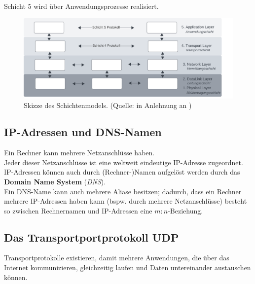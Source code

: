 \begin{tcolorbox}[enlarge top by=0.5cm,enlarge bottom by=0.5cm]
    Schicht 5 wird über Anwendungsprozesse realisiert.
\end{tcolorbox}


\begin{figure}
    \centering
    \includegraphics[width=16cm]{chapters/fopt5/img/layers}
    \caption{Skizze des Schichtenmodels. (Quelle: in Anlehnung an \cite[257, Bild 5.2]{Oec22})}
    \label{fig:layers}
\end{figure}


\subsection{IP-Adressen und DNS-Namen}

Ein Rechner kann mehrere Netzanschlüsse haben.\\

\noindent
Jeder dieser Netzanschlüsse ist eine weltweit eindeutige IP-Adresse zugeordnet.\\

\noindent
IP-Adressen können auch durch (Rechner-)Namen aufgelöst werden durch das \textbf{Domain Name System} (\textit{DNS}).\\

\noindent
Ein DNS-Name kann auch mehrere Aliase besitzen; dadurch, dass ein Rechner mehrere IP-Adressen haben kann (bspw. durch mehrere Netzanschlüsse) besteht so zwischen Rechnernamen und IP-Adressen eine $m:n$-Beziehung.


\subsection{Das Transportportprotokoll UDP}

Transportprotokolle existieren, damit mehrere Anwendungen, die über das Internet kommunizieren, gleichzeitig laufen und Daten untereinander austauschen können.\\

